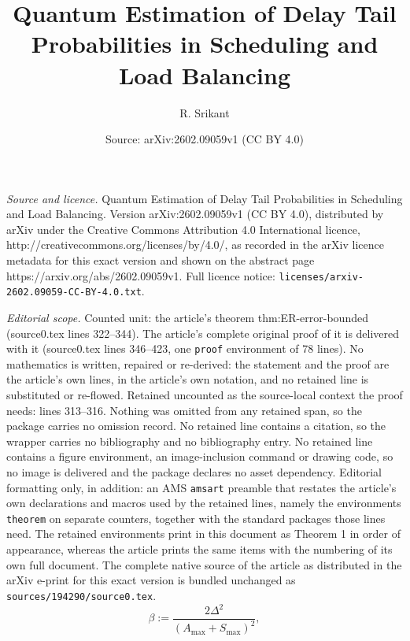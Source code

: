 \documentclass[10pt,a4paper]{amsart}
\title{Quantum Estimation of Delay Tail Probabilities in Scheduling and Load Balancing}
\author{R. Srikant}
\date{Source: arXiv:2602.09059v1 (CC BY 4.0)}
\begin{document}
\maketitle

\noindent\emph{Source and licence.} Quantum Estimation of Delay Tail Probabilities in Scheduling and Load Balancing. Version arXiv:2602.09059v1 (CC BY 4.0), distributed by arXiv under the Creative Commons Attribution 4.0 International licence, http://creativecommons.org/licenses/by/4.0/, as recorded in the arXiv licence metadata for this exact version and shown on the abstract page https://arxiv.org/abs/2602.09059v1. Full licence notice: \texttt{licenses/arxiv-2602.09059-CC-BY-4.0.txt}.\par\smallskip

\noindent\textit{Editorial scope.} Counted unit: the article's theorem thm:ER-error-bounded (source0.tex lines 322--344). The article's complete original proof of it is delivered with it (source0.tex lines 346--423, one \texttt{proof} environment of 78 lines). No mathematics is written, repaired or re-derived: the statement and the proof are the article's own lines, in the article's own notation, and no retained line is substituted or re-flowed.  Retained uncounted as the source-local context the proof needs: lines 313--316.  Nothing was omitted from any retained span, so the package carries no omission record.  No retained line contains a citation, so the wrapper carries no bibliography and no bibliography entry.  No retained line contains a figure environment, an image-inclusion command or drawing code, so no image is delivered and the package declares no asset dependency.  Editorial formatting only, in addition: an AMS \texttt{amsart} preamble that restates the article's own declarations and macros used by the retained lines, namely the environments \texttt{theorem} on separate counters, together with the standard packages those lines need.  The retained environments print in this document as Theorem 1 in order of appearance, whereas the article prints the same items with the numbering of its own full document.  The complete native source of the article as distributed in the arXiv e-print for this exact version is bundled unchanged as \texttt{sources/194290/source0.tex}.
\begin{equation}
\label{eq:beta-def}
\beta := \frac{2\Delta^2}{(A_{\max}+S_{\max})^2},
\end{equation}
\end{document}
